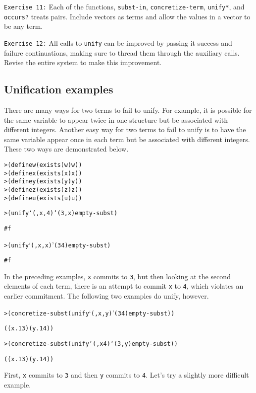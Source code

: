 \texttt{Exercise 11:} Each of the functions, \texttt{subst-in},
\texttt{concretize-term}, \texttt{unify*}, and \texttt{occurs?}
treats pairs.  Include vectors as terms and allow the values in
a vector to be any term.

\texttt{Exercise 12:} All calls to \texttt{unify} can be improved by
passing it success and failure continuations, making sure to thread
them through the auxiliary calls.  Revise the entire system to make
this improvement.

\subsection{Unification examples}

There are many ways for two terms to fail to unify.  For example, it
is possible for the same variable to appear twice in one structure but
be associated with different integers.  Another easy way for two terms
to fail to unify is to have the same variable appear once in each term
but be associated with different integers.  These two ways are
demonstrated below.

\begin{alltt}
> (define w (exists (w) w))
> (define x (exists (x) x))
> (define y (exists (y) y))
> (define z (exists (z) z))
> (define u (exists (u) u))
\end{alltt}
\newpage
\begin{alltt}
> (unify `(,x ,4) `(3 ,x) empty-subst)

#f

> (unify `(,x ,x) '(3 4) empty-subst)

#f
\end{alltt}

\noindent
In the preceding examples, \texttt{x} commits to \texttt{3},
but then looking at the second elements of each term, there is an
attempt to commit \texttt{x} to \texttt{4}, which violates an
earlier commitment.  The following two examples do unify, however.

\begin{alltt}
> (concretize-subst (unify `(,x ,y) '(3 4) empty-subst))

((x.1 3) (y.1 4))

> (concretize-subst (unify `(,x 4) `(3 ,y) empty-subst))

((x.1 3) (y.1 4))
\end{alltt}

\noindent
First, \texttt{x} commits to \texttt{3} and then \texttt{y}
commits to \texttt{4}.  Let's try a slightly more difficult
example.


